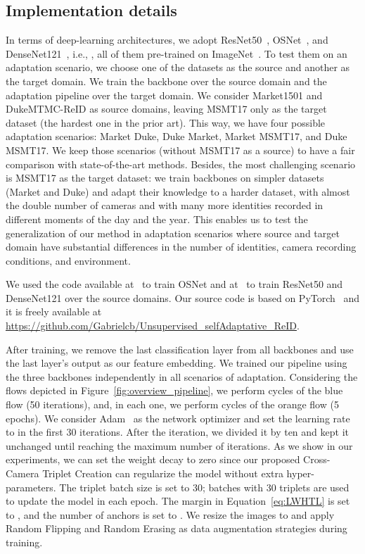 \documentclass[journal]{IEEEtran}
\begin{document}
\subsection{Implementation details}
\label{subsec:implementation_details}
In terms of deep-learning architectures, we adopt ResNet50~\cite{he2016deep}, OSNet~\cite{zhou2019omni}, and DenseNet121~\cite{huang2017densely}, i.e., , all of them pre-trained on ImageNet~\cite{deng2009imagenet}. To test them on an adaptation scenario, we choose one of the datasets as the source and another as the target domain. We train the backbone over the source domain and the adaptation pipeline over the target domain. We consider Market1501 and DukeMTMC-ReID as source domains, leaving MSMT17 only as the target dataset (the hardest one in the prior art). This way, we have four possible adaptation scenarios: Market  Duke, Duke  Market, Market  MSMT17, and Duke  MSMT17. We keep those scenarios (without MSMT17 as a source) to have a fair comparison with state-of-the-art methods. Besides, the most challenging scenario is MSMT17 as the target dataset: we train backbones on simpler datasets (Market and Duke) and adapt their knowledge to a harder dataset, with almost the double number of cameras and with many more identities recorded in different moments of the day and the year. This enables us to test the generalization of our method in adaptation scenarios where source and target domain have substantial differences in the number of identities, camera recording conditions, and environment. 

We used the code available at~\cite{torchreid} to train OSNet and at~\cite{zhai2020multiple} to train ResNet50 and DenseNet121 over the source domains. Our source code is based on PyTorch~\cite{NEURIPS2019_9015} and it is freely available at \url{https://github.com/Gabrielcb/Unsupervised_selfAdaptative_ReID}.

After training, we remove the last classification layer from all backbones and use the last layer's output as our feature embedding. We trained our pipeline using the three backbones independently in all scenarios of adaptation. Considering the flows depicted in Figure~\ref{fig:overview_pipeline}, we perform  cycles of the blue flow (50 iterations), and, in each one, we perform  cycles of the orange flow (5 epochs).  We consider Adam~\cite{kingma2014adam} as the network optimizer and set the learning rate to  in the first 30 iterations. After the  iteration, we divided it by ten and kept it unchanged until reaching the maximum number of iterations. As we show in our experiments, we can set the weight decay to zero since our proposed Cross-Camera Triplet Creation can regularize the model without extra hyper-parameters. The triplet batch size is set to 30; batches with 30 triplets are used to update the model in each epoch. The margin in Equation~\ref{eq:LWHTL} is set to , and the number of anchors is set to . We resize the images to  and apply Random Flipping and Random Erasing as data augmentation strategies during training.
 
\end{document}
